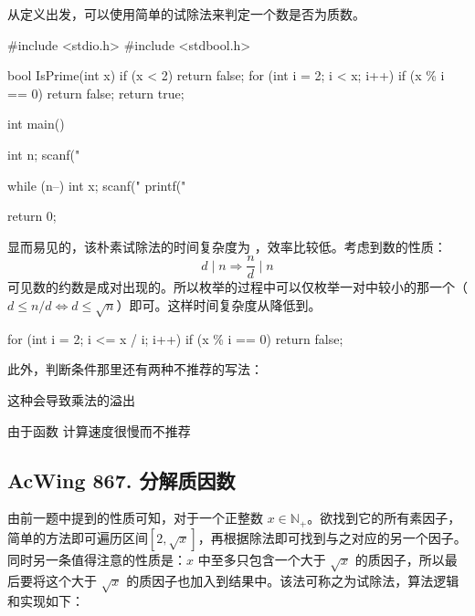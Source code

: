 从定义出发，可以使用简单的试除法来判定一个数是否为质数。

\begin{mycpptwocol}[朴素试除法]
    #include <stdio.h>
    #include <stdbool.h>

    bool IsPrime(int x) {
        if (x < 2) {
            return false;
        }
        for (int i = 2; i < x; i++) {
            if (x \% i == 0) {
                return false;
            }
        }
        return true;
    }

    int main() {
        int n;
        scanf("%

        while (n--) {
            int x;
            scanf("%
            printf("%
        }

        return 0;
    }
\end{mycpptwocol}

显而易见的，该朴素试除法的时间复杂度为 ，效率比较低。考虑到数的性质：
\begin{equation*}
    d \mid n \Rightarrow \frac{n}{d} \mid n
\end{equation*}
可见数的约数是成对出现的。所以枚举的过程中可以仅枚举一对中较小的那一个（$d \le n / d \Leftrightarrow d \le \sqrt{n}$）即可。这样时间复杂度从降低到。

\begin{mycpponecol}[优化试除法]
    for (int i = 2; i <= x / i; i++) {
        if (x \% i == 0) {
            return false;
        }
    }
\end{mycpponecol}

此外，判断条件那里还有两种不推荐的写法：
\begin{mylist}
    \item {} 这种会导致乘法的溢出
    \item {} 由于函数  计算速度很慢而不推荐
\end{mylist}

\subsection{AcWing 867. 分解质因数}

由前一题中提到的性质可知，对于一个正整数 $x \in \mathbb{N}_+$。欲找到它的所有素因子，简单的方法即可遍历区间$[2, \sqrt{x}]$，再根据除法即可找到与之对应的另一个因子。同时另一条值得注意的性质是：$x$ 中至多只包含一个大于 $\sqrt{x}$ 的质因子，所以最后要将这个大于 $\sqrt{x}$ 的质因子也加入到结果中。该法可称之为试除法，算法逻辑和实现如下：

